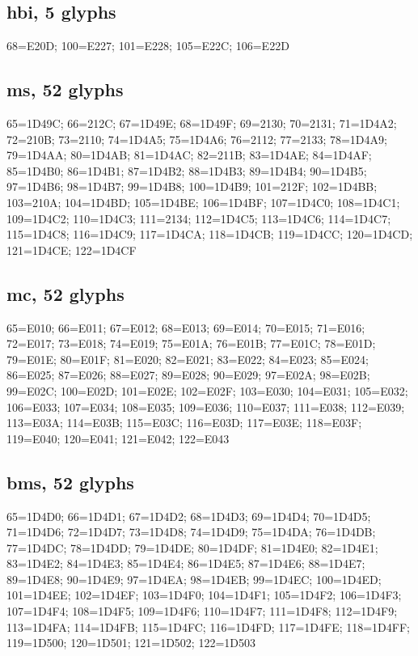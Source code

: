 \subsection*{hbi, 5 glyphs}
\raggedright\small 68=E20D; 100=E227; 101=E228; 105=E22C; 106=E22D\par

\subsection*{ms, 52 glyphs}
\raggedright\small 65=1D49C; 66=212C; 67=1D49E; 68=1D49F; 69=2130; 70=2131;
71=1D4A2; 72=210B; 73=2110; 74=1D4A5; 75=1D4A6; 76=2112; 77=2133; 78=1D4A9;
79=1D4AA; 80=1D4AB; 81=1D4AC; 82=211B; 83=1D4AE; 84=1D4AF; 85=1D4B0; 86=1D4B1;
87=1D4B2; 88=1D4B3; 89=1D4B4; 90=1D4B5; 97=1D4B6; 98=1D4B7; 99=1D4B8;
100=1D4B9; 101=212F; 102=1D4BB; 103=210A; 104=1D4BD; 105=1D4BE; 106=1D4BF;
107=1D4C0; 108=1D4C1; 109=1D4C2; 110=1D4C3; 111=2134; 112=1D4C5; 113=1D4C6;
114=1D4C7; 115=1D4C8; 116=1D4C9; 117=1D4CA; 118=1D4CB; 119=1D4CC; 120=1D4CD;
121=1D4CE; 122=1D4CF\par

\subsection*{mc, 52 glyphs}
\raggedright\small 65=E010; 66=E011; 67=E012; 68=E013; 69=E014; 70=E015;
71=E016; 72=E017; 73=E018; 74=E019; 75=E01A; 76=E01B; 77=E01C; 78=E01D;
79=E01E; 80=E01F; 81=E020; 82=E021; 83=E022; 84=E023; 85=E024; 86=E025;
87=E026; 88=E027; 89=E028; 90=E029; 97=E02A; 98=E02B; 99=E02C; 100=E02D;
101=E02E; 102=E02F; 103=E030; 104=E031; 105=E032; 106=E033; 107=E034; 108=E035;
109=E036; 110=E037; 111=E038; 112=E039; 113=E03A; 114=E03B; 115=E03C; 116=E03D;
117=E03E; 118=E03F; 119=E040; 120=E041; 121=E042; 122=E043\par

\subsection*{bms, 52 glyphs}
\raggedright\small 65=1D4D0; 66=1D4D1; 67=1D4D2; 68=1D4D3; 69=1D4D4; 70=1D4D5;
71=1D4D6; 72=1D4D7; 73=1D4D8; 74=1D4D9; 75=1D4DA; 76=1D4DB; 77=1D4DC; 78=1D4DD;
79=1D4DE; 80=1D4DF; 81=1D4E0; 82=1D4E1; 83=1D4E2; 84=1D4E3; 85=1D4E4; 86=1D4E5;
87=1D4E6; 88=1D4E7; 89=1D4E8; 90=1D4E9; 97=1D4EA; 98=1D4EB; 99=1D4EC;
100=1D4ED; 101=1D4EE; 102=1D4EF; 103=1D4F0; 104=1D4F1; 105=1D4F2; 106=1D4F3;
107=1D4F4; 108=1D4F5; 109=1D4F6; 110=1D4F7; 111=1D4F8; 112=1D4F9; 113=1D4FA;
114=1D4FB; 115=1D4FC; 116=1D4FD; 117=1D4FE; 118=1D4FF; 119=1D500; 120=1D501;
121=1D502; 122=1D503\par

